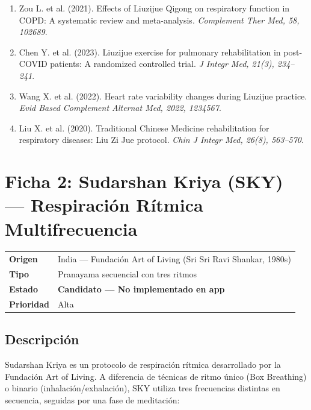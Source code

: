 \documentclass[12pt,a4paper]{article}
\begin{document}
\begin{enumerate}
    \item Zou L. et al. (2021). Effects of Liuzijue Qigong on respiratory
          function in COPD: A systematic review and meta-analysis.
          \textit{Complement Ther Med, 58, 102689}.
    \item Chen Y. et al. (2023). Liuzijue exercise for pulmonary
          rehabilitation in post-COVID patients: A randomized controlled
          trial. \textit{J Integr Med, 21(3), 234--241}.
    \item Wang X. et al. (2022). Heart rate variability changes during
          Liuzijue practice. \textit{Evid Based Complement Alternat Med,
          2022, 1234567}.
    \item Liu X. et al. (2020). Traditional Chinese Medicine rehabilitation
          for respiratory diseases: Liu Zi Jue protocol.
          \textit{Chin J Integr Med, 26(8), 563--570}.
\end{enumerate}

\section{Ficha 2: Sudarshan Kriya (SKY) — Respiración Rítmica Multifrecuencia}

\begin{tabularx}{\textwidth}{ll}
    \toprule
    \textbf{Origen} & India — Fundación Art of Living (Sri Sri Ravi Shankar, 1980s) \\
    \textbf{Tipo} & Pranayama secuencial con tres ritmos \\
    \textbf{Estado} & \textbf{Candidato — No implementado en app} \\
    \textbf{Prioridad} & Alta \\
    \bottomrule
\end{tabularx}

\subsection{Descripción}

Sudarshan Kriya es un protocolo de respiración rítmica desarrollado por la
Fundación Art of Living. A diferencia de técnicas de ritmo único (Box
Breathing) o binario (inhalación/exhalación), SKY utiliza tres frecuencias
distintas en secuencia, seguidas por una fase de meditación:
\end{document}
